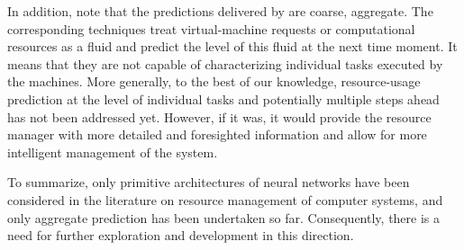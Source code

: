 In addition, note that the predictions delivered by \cite{cao2014, dabbagh2015,
ismaeel2015} are coarse, aggregate. The corresponding techniques treat
virtual-machine requests or computational resources as a fluid and predict the
level of this fluid at the next time moment. It means that they are not capable
of characterizing individual tasks executed by the machines. More generally, to
the best of our knowledge, resource-usage prediction at the level of individual
tasks and potentially multiple steps ahead has not been addressed yet. However,
if it was, it would provide the resource manager with more detailed and
foresighted information and allow for more intelligent management of the system.

To summarize, only primitive architectures of neural networks have been
considered in the literature on resource management of computer systems, and
only aggregate prediction has been undertaken so far. Consequently, there is a
need for further exploration and development in this direction.
